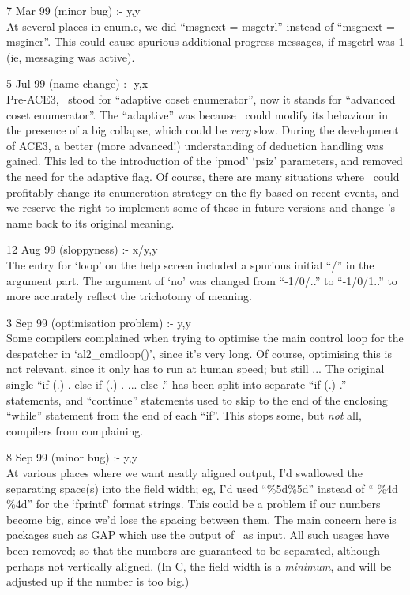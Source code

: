 7 Mar 99 (minor bug) :- y,y \\
At several places in enum.c, we did ``msgnext = msgctrl'' instead of 
  ``msgnext = msgincr''.
This could cause spurious additional progress messages, if msgctrl was 1
  (ie, messaging was active).

5 Jul 99 (name change) :- y,x \\
Pre-ACE3, \ace\ stood for ``adaptive coset enumerator'', now it stands for
  ``advanced coset enumerator''.
The ``adaptive'' was because \ace\ could modify its behaviour in the
  presence of a big collapse, which could be \emph{very} slow.
During the development of ACE3, a better (more advanced!) understanding of
  deduction handling was gained.
This led to the introduction of the `pmod' \amp `psiz' parameters, and
  removed the need for the adaptive flag.
Of course, there are many situations where \ace\ could profitably change
  its enumeration strategy on the fly based on recent events, and we
  reserve the right to implement some of these in future versions and
  change \ace's name back to its original meaning.

12 Aug 99 (sloppyness) :- x/y,y \\
The entry for `loop' on the help screen included a spurious initial ``/''
  in the argument part.
The argument of `no' was changed from ``-1/0/..'' to ``-1/0/1..'' to more
  accurately reflect the trichotomy of meaning.

3 Sep 99 (optimisation problem) :- y,y \\
Some compilers complained when trying to optimise the main control loop for
  the despatcher in `al2\_cmdloop()', since it's very long.
Of course, optimising this is not relevant, since it only has to run at
  human speed; but still ...
The original single ``if (.) {.} else if (.) {.} ... else {.}'' has been 
  split into separate ``if (.) {.}'' statements, and ``continue''
  statements used to skip to the end of the enclosing ``while'' statement
  from the end of each ``if''.
This stops some, but \emph{not} all, compilers from complaining.

8 Sep 99 (minor bug) :- y,y \\
At various places where we want neatly aligned output, I'd swallowed the
  separating space(s) into the field width; eg, I'd used ``\%5d\%5d''
  instead of `` \%4d \%4d'' for the `fprintf' format strings.
This could be a problem if our numbers become big, since we'd lose the
  spacing between them.
The main concern here is packages such as GAP which use the output of \ace\
  as input.
All such usages have been removed; so that the numbers are guaranteed to be
  separated, although perhaps not vertically aligned.
(In C, the field width is a \emph{minimum}, and will be adjusted up if the 
  number is too big.)

